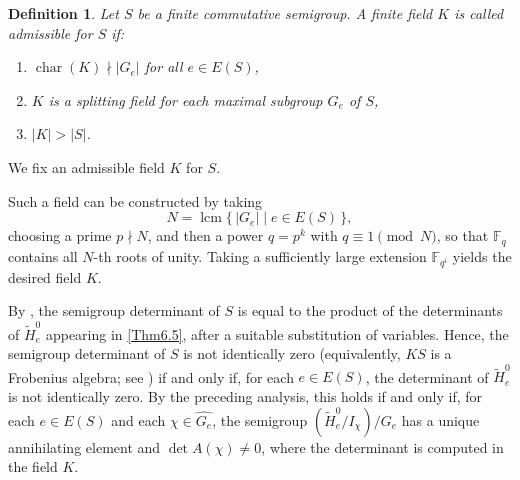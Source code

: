 \documentclass[11pt,reqno]{amsart}
\theoremstyle{plain}
\newtheorem{thm}{Theorem}[section]
\newtheorem{ddef}[thm]{Definition}
\theoremstyle{remark}
\theoremstyle{definition}
\begin{document}
\begin{ddef}
Let $S$ be a finite commutative semigroup. 
A finite field $K$ is called \emph{admissible for $S$} if:
\begin{enumerate}
\item $\operatorname{char}(K)\nmid |G_e|$ for all $e \in E(S)$,
\item $K$ is a splitting field for each maximal subgroup $G_e$ of $S$,
\item $|K| > |S|$.
\end{enumerate}
\end{ddef}

We fix an admissible field $K$ for $S$.

Such a field can be constructed by taking 
\[
N = \operatorname{lcm}\{\, |G_e| \mid e \in E(S)\,\},
\]
choosing a prime $p \nmid N$, and then a power $q=p^k$ with $q \equiv 1 \pmod N$, so that $\mathbb{F}_q$ contains all $N$-th roots of unity. Taking a sufficiently large extension $\mathbb{F}_{q^i}$ yields the desired field $K$.

By \cite[Theorem~6.6]{Ste-Fac-det}, the semigroup determinant of $S$ is equal to the product of the determinants of $\widetilde{H}_e^{0}$ appearing in \eqref{Thm6.5}, after a suitable substitution of variables.
Hence, the semigroup determinant of $S$ is not identically zero (equivalently, $KS$ is a Frobenius algebra; see \cite[Theorem~2.1]{Ste-Fac-det}) if and only if, for each $e \in E(S)$, the determinant of $\widetilde{H}_e^{0}$ is not identically zero.
By the preceding analysis, this holds if and only if, for each $e \in E(S)$ and each $\chi \in \widehat{G_e}$, the semigroup $(\widetilde{H}_e^0 / I_{\chi}) / G_e$ has a unique annihilating element and $\det A(\chi) \neq 0$, where the determinant is computed in the field $K$.

%
%
%
\end{document}
